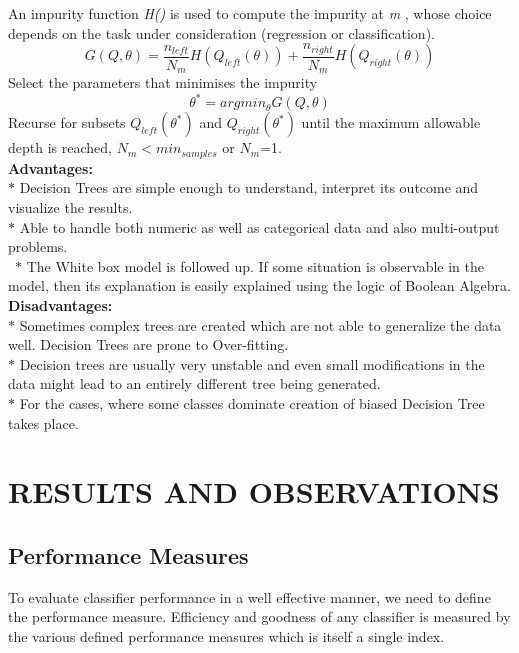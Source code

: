 \documentclass[a4paper, 10pt, conference]{IEEEtran}
\begin{document}
An impurity function \textit{H()} is used to compute the impurity at \textit{m} , whose choice depends on the task under consideration (regression or classification).
\[ G(Q,\theta) = \frac{n_{left}}{N_{m}}H(Q_{left}(\theta)) + \frac{n_{right}}{N_{m}}H(Q_{right}(\theta))
\]
Select the parameters that minimises the impurity
\[ \theta^{\ast} = arg min_{\theta}G(Q,\theta)
\]
Recurse for subsets \textit{$Q_{left}(\theta^{\ast})$} and \textit{$Q_{right}(\theta^{\ast})$} until the maximum allowable depth is reached, \textit{$N_{m}< min_{samples}$} or \textit{$N_{m}$}=1.
\\

\textbf{Advantages:}\\
\indent $\ast$ Decision Trees are simple enough to understand, interpret its outcome and visualize the results.\\
\indent $\ast$ Able to handle both numeric as well as categorical data and also multi-output problems.\\\
\indent $\ast$ The White box model is followed up. If some situation is observable in the model, then its explanation is easily explained using the logic of Boolean Algebra.\\

\textbf{Disadvantages:}\\
\indent $\ast$ Sometimes complex trees are created which are not able to generalize the data well. Decision Trees are prone to Over-fitting.\\
\indent $\ast$ Decision trees are usually very unstable and even small modifications in the data might lead to an entirely different tree being generated.\\
\indent $\ast$ For the cases, where some classes dominate creation of biased Decision Tree takes place.\\


\section{RESULTS AND OBSERVATIONS}

\subsection{Performance Measures}
To evaluate classifier performance in a well effective manner, we need to define the performance measure. Efficiency and goodness of any classifier is measured by the various defined performance measures which is itself a single index.
\end{document}
